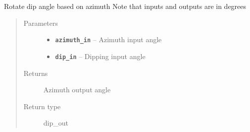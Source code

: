 \documentclass[letterpaper,10pt,english]{sphinxmanual}
\begin{document}
\begin{fulllineitems}
\label{hyvr:hyvr.hyvr.sim.dip_rotate}
Rotate dip angle based on azimuth
Note that inputs and outputs are in degrees
\begin{quote}\begin{description}
\item[{Parameters}] \leavevmode\begin{itemize}
\item {} 
\textbf{\texttt{azimuth\_in}} -- Azimuth input angle

\item {} 
\textbf{\texttt{dip\_in}} -- Dipping input angle

\end{itemize}

\item[{Returns}] \leavevmode
Azimuth output angle

\item[{Return type}] \leavevmode
dip\_out

\end{description}\end{quote}

\end{fulllineitems}

\end{document}

